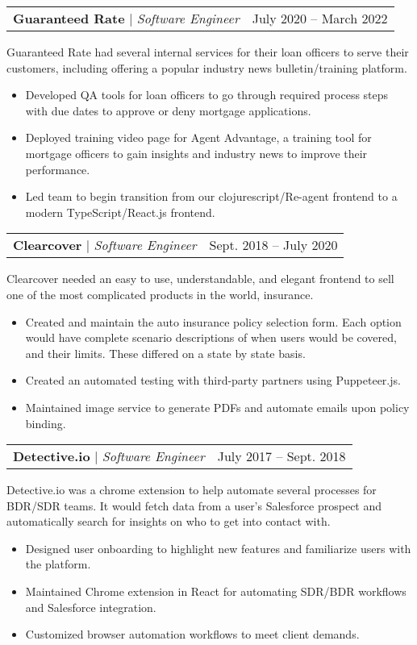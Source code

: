 \documentclass[letterpaper,11pt]{article}
\makeatletter
\newcommand{\resumeItem}[1]{
  \item\small{
    {#1 \vspace{-2pt}}}}
\newcommand{\resumeProjectHeading}[2]{
    \item
    \begin{tabular*}{0.97\textwidth}{l@{\extracolsep{\fill}}r}
      \small#1 & #2 \\
    \end{tabular*}\vspace{-7pt}
}
\newcommand{\resumeItemListStart}{\begin{itemize}\vspace{-6px}}
\newcommand{\resumeItemListEnd}{\end{itemize}\vspace{-8pt}}
\makeatother
\begin{document}
    \resumeProjectHeading
      {\textbf{Guaranteed Rate}\vspace{8pt} $|$ \footnotesize\emph{Software Engineer}}{July 2020 -- March 2022}
      \small{Guaranteed Rate had several internal services for their loan officers to serve their
      customers, including offering a popular industry news bulletin/training platform.}
      \resumeItemListStart
        \resumeItem{Developed QA tools for loan officers to go through required process steps with
        due dates to approve or deny mortgage applications.}
        \resumeItem{Deployed training video page for Agent Advantage, a training tool for mortgage
        officers to gain insights and industry news to improve their performance.}
        \resumeItem{Led team to begin transition from our clojurescript/Re-agent frontend to a
        modern TypeScript/React.js frontend.}
      \resumeItemListEnd

    \resumeProjectHeading
      {\textbf{Clearcover} $|$ \footnotesize\emph{Software Engineer}\vspace{8pt}}{Sept. 2018 -- July 2020}
      {\small{Clearcover needed an easy to use, understandable, and elegant frontend to sell
    one of the most complicated products in the world, insurance.}}
      \resumeItemListStart
        \resumeItem{Created and maintain the auto insurance policy selection form. Each option
        would have complete scenario descriptions of when users would be covered,
        and their limits. These differed on a state by state basis.}
        \resumeItem{Created an automated testing with third-party partners using Puppeteer.js.}
        \resumeItem{Maintained image service to generate PDFs and automate emails upon policy
        binding.}
      \resumeItemListEnd

    \resumeProjectHeading
      {\textbf{Detective.io} $|$ \footnotesize\emph{Software Engineer}\vspace{8pt}}{July 2017 -- Sept. 2018}
      {\small{Detective.io was a chrome extension to help automate several processes for
      BDR/SDR teams. It would fetch data from a user's Salesforce prospect and
      automatically search for insights on who to get into contact with.}}
      \resumeItemListStart
        \resumeItem{Designed user onboarding to highlight new features and familiarize users with
        the platform.}
        \resumeItem{Maintained Chrome extension in React for automating SDR/BDR workflows and
        Salesforce integration.}
        \resumeItem{Customized browser automation workflows to meet client demands.}
      \resumeItemListEnd
\end{document}
